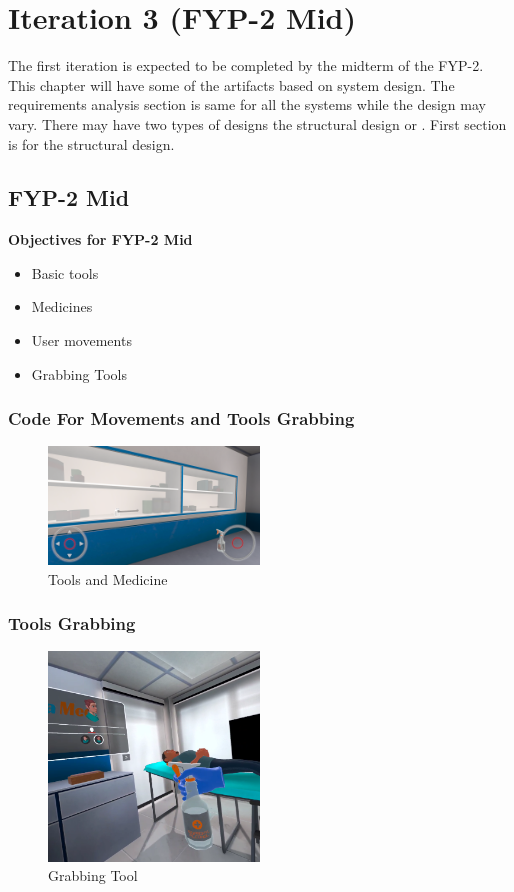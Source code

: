 \chapter{Iteration 3 (FYP-2 Mid)}
\label{ch:iter3}

The first iteration is expected to be completed by the midterm of the FYP-2.
This chapter will have some of the artifacts based on system design. The requirements analysis section is same for all the systems while the design may vary. There may have two types of designs the structural design or . First section is for the structural design.


\section{FYP-2 Mid}
\textbf{Objectives for FYP-2 Mid}
	\begin{itemize}
		\item Basic tools
		\item Medicines 
		\item User movements
		\item Grabbing Tools
	\end{itemize}
\newpage
\subsection{Code For Movements and Tools Grabbing}
\begin{figure}[h]
	\centering
	\includegraphics[width=0.5\textwidth, height=0.3\textheight]{Images/Tools and Medicine.png}
	\caption{Tools and Medicine}
	\label{fig:Tools and Medicine}
\end{figure}

\subsection{Tools Grabbing}
\begin{figure}[h]
	\centering
	\includegraphics[width=0.5\textwidth, height=0.3\textheight]{Images/Grabbing Tool.png}
	\caption{Grabbing Tool}
	\label{fig:Grabbing-Tool}
\end{figure}

